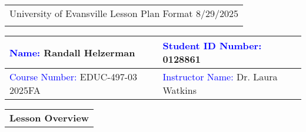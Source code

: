 \begin{tabularx}{\textwidth}{Y}
  {\large University of Evansville Lesson Plan Format 8/29/2025} \\
   \hline \\
\end{tabularx}


\begin{tabularx}{\textwidth}{|X|X|}
  \hline 
  \textcolor{blue}{Name:} Randall Helzerman         &   \textcolor{blue}{Student ID Number:} 0128861 \\
  \hline 
  \textcolor{blue}{Course Number:} EDUC-497-03 2025FA &   \textcolor{blue}{Instructor Name:} Dr. Laura Watkins\\
  \hline 
\end{tabularx}

\vskip 10pt

\begin{tabularx}{\textwidth}{Y}
  {\bf Lesson Overview} \\
\end{tabularx}


